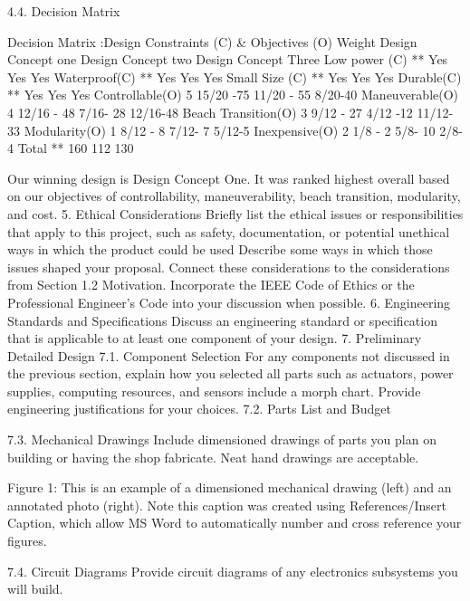         4.4. Decision Matrix

Decision Matrix :Design Constraints (C)
 &
Objectives (O)
Weight
Design Concept 
one 
Design Concept 
two
Design Concept Three
Low power (C)
**
Yes
Yes
Yes
Waterproof(C)
**
Yes
Yes
Yes
Small Size (C)
**
Yes
Yes
Yes
Durable(C)
**
Yes
Yes
Yes
Controllable(O)
5
15/20 -75
11/20 - 55
8/20-40
Maneuverable(O)
4
12/16 - 48
7/16- 28
12/16-48
Beach Transition(O)
3
9/12 - 27
4/12 -12
11/12- 33
Modularity(O)
1
8/12 - 8
7/12- 7
5/12-5
Inexpensive(O)
2
1/8 - 2
5/8- 10
2/8- 4
Total
**
160
112
130

Our winning design is Design Concept One. It was ranked highest overall based on our objectives of controllability, maneuverability, beach transition, modularity, and cost. 
    5. Ethical Considerations
Briefly list the ethical issues or responsibilities that apply to this project, such as safety, documentation, or potential unethical ways in which the product could be used
Describe some ways in which those issues shaped your proposal.
Connect these considerations to the considerations from Section 1.2 Motivation.
  Incorporate the IEEE Code of Ethics or the Professional Engineer’s Code into your discussion when possible. 
    6. Engineering Standards and Specifications
Discuss an engineering standard or specification that is applicable to at least one component of your design.
    7. Preliminary Detailed Design
        7.1. Component Selection
For any components not discussed in the previous section, explain how you selected all parts such as actuators, power supplies, computing resources, and sensors include a morph chart.  Provide engineering justifications for your choices.  
        7.2. Parts List and Budget


        7.3. Mechanical Drawings
Include dimensioned drawings of parts you plan on building or having the shop fabricate.   Neat hand drawings are acceptable. 


Figure 1: This is an example of a dimensioned mechanical drawing (left) and an annotated photo (right).   Note this caption was created using References/Insert Caption, which allow MS Word to automatically number and cross reference your figures.












        7.4. Circuit Diagrams
Provide circuit diagrams of any electronics subsystems you will build.

